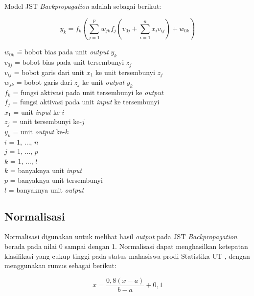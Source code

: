 \noindent Model JST \textit{Backpropagation} adalah sebagai berikut:

\begin{equation}
    y_k = f_k \left( \sum_{j = 1}^{p} w_{jk} f_j \left( v_{0j} + \sum_{i = 1}^{n} x_i v_{ij} \right) + w_{0k} \right)  \label{eq1}
\end{equation}

\begin{tabbing}
    $w_{0k}$ \= = bobot bias pada unit \textit{output} $y_k$ \\
    $v_{0j}$ \> = bobot bias pada unit tersembunyi $z_j$ \\
    $v_{ij}$ \> = bobot garis dari unit $x_1$ ke unit tersembunyi $z_j$ \\
    $w_{jk}$ \> = bobot garis dari $z_j$ ke unit \textit{output} $y_k$ \\
    $f_k$ \> = fungsi aktivasi pada unit tersembunyi ke \textit{output} \\
    $f_j$ \> = fungsi aktivasi pada unit \textit{input} ke tersembunyi \\
    $x_1$ \> = unit \textit{input} ke-$i$ \\
    $z_j$ \> = unit tersembunyi ke-$j$ \\
    $y_k$ \> = unit \textit{output} ke-$k$ \\
    $i$ \> = $1,\, \dots,\, n$ \\
    $j$ \> = $1,\, \dots,\, p$ \\
    $k$ \> = $1,\, \dots,\, l$ \\
    $k$ \> = banyaknya unit \textit{input} \\
    $p$ \> = banyaknya unit tersembunyi \\
    $l$ \> = banyaknya unit \textit{output}
\end{tabbing}

\subsection{Normalisasi}

Normalisasi digunakan untuk melihat hasil \textit{output} pada JST \textit{Backpropagation} berada pada nilai 0 sampai dengan 1. Normalisasi dapat menghasilkan ketepatan klasifikasi yang cukup tinggi pada status mahasiswa prodi Statistika UT \cite{aksu-2019:effect}, dengan menggunakan rumus sebagai berikut:

\begin{equation}
    x = \frac{0{,}8(x - a)}{b - a} + 0{,}1  \label{eq2}
\end{equation}


